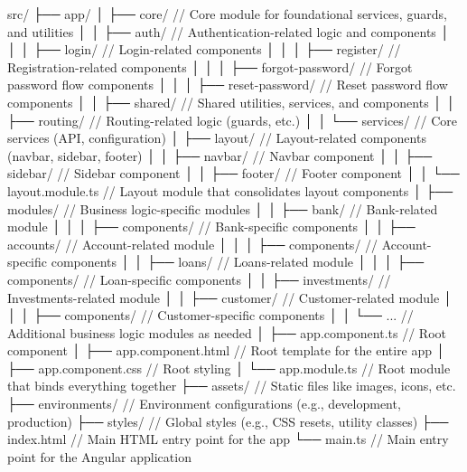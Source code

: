 src/
├── app/
│   ├── core/                            // Core module for foundational services, guards, and utilities
│   │   ├── auth/                        // Authentication-related logic and components
│   │   │   ├── login/                   // Login-related components
│   │   │   ├── register/                // Registration-related components
│   │   │   ├── forgot-password/         // Forgot password flow components
│   │   │   ├── reset-password/          // Reset password flow components
│   │   ├── shared/                      // Shared utilities, services, and components
│   │   ├── routing/                     // Routing-related logic (guards, etc.)
│   │   └── services/                    // Core services (API, configuration)
│   ├── layout/                          // Layout-related components (navbar, sidebar, footer)
│   │   ├── navbar/                      // Navbar component
│   │   ├── sidebar/                     // Sidebar component
│   │   ├── footer/                      // Footer component
│   │   └── layout.module.ts             // Layout module that consolidates layout components
│   ├── modules/                         // Business logic-specific modules
│   │   ├── bank/                        // Bank-related module
│   │   │   ├── components/              // Bank-specific components
│   │   ├── accounts/                    // Account-related module
│   │   │   ├── components/              // Account-specific components
│   │   ├── loans/                       // Loans-related module
│   │   │   ├── components/              // Loan-specific components
│   │   ├── investments/                 // Investments-related module
│   │   ├── customer/                    // Customer-related module
│   │   │   ├── components/              // Customer-specific components
│   │   └── ...                          // Additional business logic modules as needed
│   ├── app.component.ts                 // Root component
│   ├── app.component.html               // Root template for the entire app
│   ├── app.component.css                // Root styling
│   └── app.module.ts                    // Root module that binds everything together
├── assets/                             // Static files like images, icons, etc.
├── environments/                       // Environment configurations (e.g., development, production)
├── styles/                             // Global styles (e.g., CSS resets, utility classes)
├── index.html                          // Main HTML entry point for the app
└── main.ts                             // Main entry point for the Angular application



